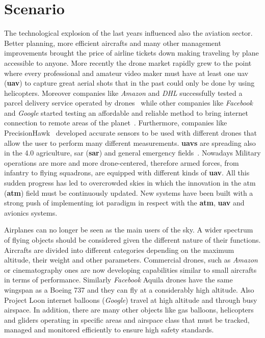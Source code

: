 \documentclass[../main.tex]{subfiles}
\begin{document}
\chapter{Scenario}
\label{chap:avionicsprot}

The technological explosion of the last years influenced also the aviation
sector. Better planning, more efficient aircrafts and many other management
improvements brought the price of airline tickets down making traveling by plane
accessible to anyone. More recently the drone market rapidly grew to the point
where every professional and amateur video maker must have at least one
\acrlong{uav} (\textbf{\acrshort{uav}}) to capture great aerial shots that in
the past could only be done by using helicopters. Moreover companies like
\textit{Amazon} and \textit{DHL} successfully tested a parcel delivery service
operated by drones~\cite{primeair} while other companies like \textit{Facebook}
and \textit{Google} started testing an affordable and reliable method to bring
internet connection to remote areas of the planet~\cite{loon}. Furthermore,
companies like PrecisionHawk~\cite{prechwk} developed accurate sensors to be
used with different drones that allow the user to perform many different
measurements. \textbf{\acrshort{uav}s} are spreading also in the 4.0
agriculture, \acrlong{sar} (\textbf{\acrshort{sar}}) and general emergency
fields~\cite{vvff}. Nowadays Military operations are more and more
drone-centered, therefore armed forces, from infantry to flying squadrons, are
equipped with different kinds of \textbf{\acrshort{uav}}. All this sudden
progress has led to overcrowded skies in which the innovation in the
\acrlong{atm} (\textbf{\acrshort{atm}}) field must be continuously updated. New
systems have been built with a strong push of implementing \acrshort{iot}
paradigm in respect with the \textbf{\acrshort{atm}}, \textbf{\acrshort{uav}}
and avionics systems.

Airplanes can no longer be seen as the main users of the sky. A wider spectrum
of flying objects should be considered given the different nature of their
functions. Aircrafts are divided into different categories depending on the
maximum altitude, their weight and other parameters. Commercial drones, such as
\textit{Amazon} or cinematography ones are now developing capabilities similar
to small aircrafts in terms of performance. Similarly \textit{Facebook} Aquila
drones have the same wingspan as a Boeing 737 and they can fly at a considerably
high altitude\cite{fbaquila}. Also Project Loon internet balloons
(\textit{Google}) travel at high altitude and through busy airspace. In
addition, there are many other objects like gas balloons, helicopters and
gliders operating in specific areas and airspace class that must be tracked,
managed and monitored efficiently to ensure high safety standards.
\end{document}
